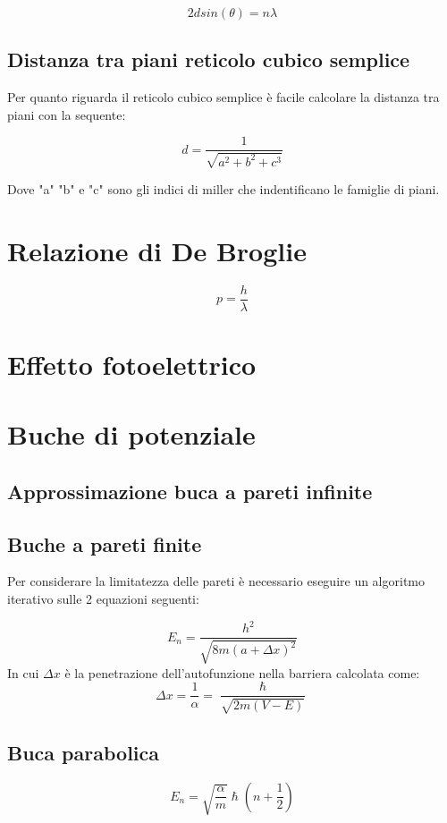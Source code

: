 \documentclass[10pt,a4paper]{report}
\begin{document}
	\[
	2dsin(\theta)=n\lambda
	\]


	\section{Distanza tra piani reticolo cubico semplice}

	Per quanto riguarda il reticolo cubico semplice è facile calcolare la distanza tra piani con la sequente:

	\[
	d=\frac{1}{\sqrt{a^2+b^2+c^3}}
	\]

	Dove "a" "b" e "c" sono gli indici di miller che indentificano le famiglie di piani.
\chapter{Relazione di De Broglie}

\[
p=\frac {h}{\lambda}
\]


\chapter{Effetto fotoelettrico}

\chapter{Buche di potenziale}

	\section{Approssimazione buca a pareti infinite}

	\section{Buche a pareti finite}

	Per considerare la limitatezza delle pareti è necessario eseguire un algoritmo iterativo sulle 2 equazioni seguenti:

	\[
		E_n=\frac{h^2}{\sqrt{8m(a+\Delta x)^2}}
	\]
	In cui $\Delta x$ è la penetrazione dell'autofunzione nella barriera calcolata come:
	\[
	\Delta x = \frac{1}{\alpha}=\frac{\hslash}{\sqrt{2m(V-E)}}
	\]

	\section{Buca parabolica}
	
	\[
	E_n = \sqrt{\frac{\alpha}{m}}\hslash(n+\frac{1}{2})
	\]
\end{document}
